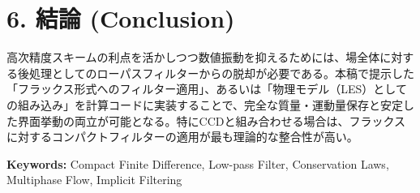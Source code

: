\documentclass[12pt, a4paper, titlepage]{article}
\begin{document}
\section*{6. 結論 (Conclusion)}
高次精度スキームの利点を活かしつつ数値振動を抑えるためには、場全体に対する後処理としてのローパスフィルターからの脱却が必要である。本稿で提示した「フラックス形式へのフィルター適用」、あるいは「物理モデル（LES）としての組み込み」を計算コードに実装することで、完全な質量・運動量保存と安定した界面挙動の両立が可能となる。特にCCDと組み合わせる場合は、フラックスに対するコンパクトフィルターの適用が最も理論的な整合性が高い。

\textbf{Keywords:} Compact Finite Difference, Low-pass Filter, Conservation Laws, Multiphase Flow, Implicit Filtering
\end{document}
